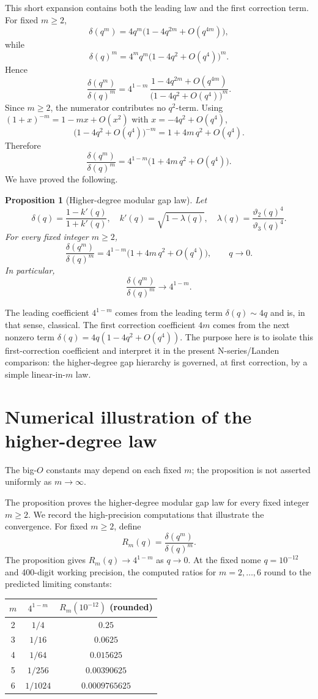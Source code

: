 \documentclass[11pt]{article}
\newtheorem{proposition}{Proposition}
\begin{document}
This short expansion contains both the leading law and the first correction term.
For fixed $m\ge 2$,
\[
\delta(q^m)=4q^m\bigl(1-4q^{2m}+O(q^{4m})\bigr),
\]
while
\[
\delta(q)^m=4^m q^m\bigl(1-4q^2+O(q^4)\bigr)^m.
\]
Hence
\[
\frac{\delta(q^m)}{\delta(q)^m}
=4^{1-m}\,
\frac{1-4q^{2m}+O(q^{4m})}{\bigl(1-4q^2+O(q^4)\bigr)^m}.
\]
Since $m\ge 2$, the numerator contributes no $q^2$-term. Using
$(1+x)^{-m}=1-mx+O(x^2)$ with $x=-4q^2+O(q^4)$,
\[
\bigl(1-4q^2+O(q^4)\bigr)^{-m}=1+4m\,q^2+O(q^4).
\]
Therefore
\[
\frac{\delta(q^m)}{\delta(q)^m}=4^{1-m}\bigl(1+4m\,q^2+O(q^4)\bigr).
\]
We have proved the following.

\begin{proposition}[Higher-degree modular gap law]\label{prop:gap}
Let
\[
\delta(q)=\frac{1-k'(q)}{1+k'(q)},
\quad
k'(q)=\sqrt{1-\lambda(q)},
\quad
\lambda(q)=\frac{\vartheta_2(q)^4}{\vartheta_3(q)^4}.
\]
For every fixed integer $m\ge 2$,
\[
\frac{\delta(q^m)}{\delta(q)^m}=4^{1-m}\bigl(1+4m\,q^2+O(q^4)\bigr),
\qquad q\to 0.
\]
In particular,
\[
\frac{\delta(q^m)}{\delta(q)^m}\longrightarrow 4^{1-m}.
\]
\end{proposition}

The leading coefficient $4^{1-m}$ comes from the leading term $\delta(q)\sim 4q$
and is, in that sense, classical. The first correction coefficient $4m$ comes
from the next nonzero term $\delta(q)=4q(1-4q^2+O(q^4))$. The purpose here is to isolate this first-correction coefficient and interpret
it in the present N-series/Landen comparison: the higher-degree gap hierarchy is governed, at first
correction, by a simple linear-in-$m$ law.

\section{Numerical illustration of the higher-degree law}

The big-$O$ constants may depend on each fixed $m$; the proposition is not
asserted uniformly as $m\to\infty$.

The proposition proves the higher-degree modular gap law for every fixed integer
$m\ge 2$. We record the high-precision computations that illustrate the
convergence. For fixed $m\ge 2$, define
\[
R_m(q)=\frac{\delta(q^m)}{\delta(q)^m}.
\]
The proposition gives $R_m(q)\to 4^{1-m}$ as $q\to 0$. At the fixed nome $q=10^{-12}$ and 400-digit working precision, the computed
ratios for $m=2,\dots,6$ round to the predicted limiting constants:

\begin{center}
\begin{tabular}{ccc}
\toprule
$m$ & $4^{1-m}$ & $R_m(10^{-12})$ (rounded) \\
\midrule
2 & $1/4$    & $0.25$ \\
3 & $1/16$   & $0.0625$ \\
4 & $1/64$   & $0.015625$ \\
5 & $1/256$  & $0.00390625$ \\
6 & $1/1024$ & $0.0009765625$ \\
\bottomrule
\end{tabular}
\end{center}
\end{document}
